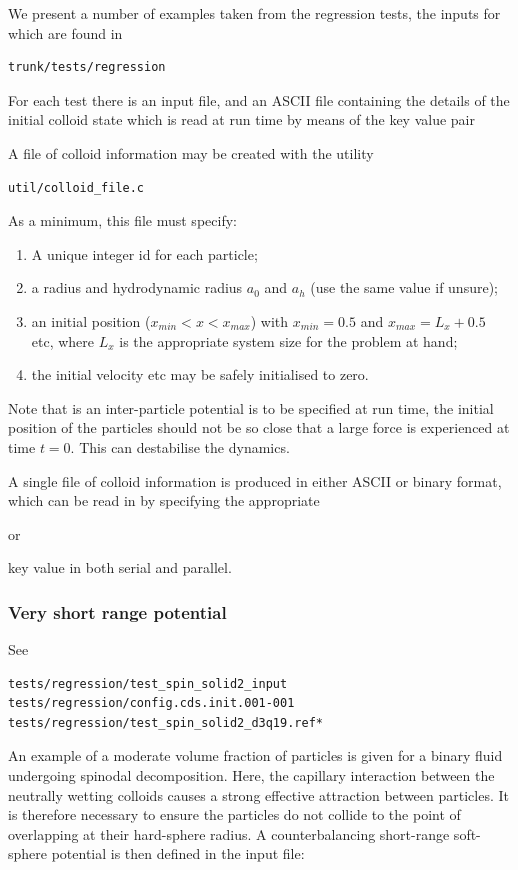 We present a number of examples taken from the regression tests, the inputs
for which are found in
\begin{verbatim}
trunk/tests/regression
\end{verbatim}
For each test there is an input file, and an ASCII file containing the
details of the initial colloid state which is read at run time by means
of the key value pair


A file of colloid information may be created with the utility
\begin{verbatim}
util/colloid_file.c
\end{verbatim}
As a minimum, this file must specify:
\begin{enumerate}
\item
A unique integer id for each particle;
\item
a radius and hydrodynamic radius $a_0$ and $a_h$ (use the same value
if unsure);
\item
an initial position ($x_{min} < x < x_{max}$) with $x_{min} = 0.5$
and $x_{max} = L_x + 0.5$ etc, where $L_x$ is the appropriate system
size for the problem at hand;
\item
the initial velocity etc may be safely initialised to zero.
\end{enumerate}
Note that is an inter-particle potential is to be specified at run time,
the initial position of the particles should not be so close that a
large force is experienced at time $t=0$. This can destabilise the
dynamics.

A single file of colloid information is produced in either ASCII or binary
format, which can be read in by specifying the appropriate

 or 

key value in both serial and parallel.


\subsubsection{Very short range potential}

See
\begin{verbatim}
tests/regression/test_spin_solid2_input
tests/regression/config.cds.init.001-001
tests/regression/test_spin_solid2_d3q19.ref*
\end{verbatim}

An example of a moderate volume fraction of particles is given for
a binary fluid undergoing spinodal decomposition. Here,
the capillary interaction between the neutrally wetting colloids
causes a strong effective attraction between particles. It is therefore
necessary to ensure the particles do not collide to the point of
overlapping at their hard-sphere radius. A counterbalancing short-range
soft-sphere potential is then defined in the input file:

